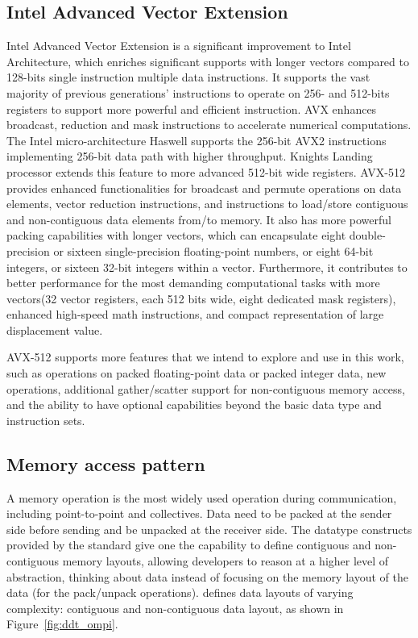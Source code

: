 \documentclass[conference]{IEEEtran}
\begin{document}
\subsection{Intel Advanced Vector Extension}
Intel Advanced Vector Extension is a significant improvement to Intel Architecture, which enriches
significant supports with longer vectors compared to 128-bits single instruction multiple data instructions.
It supports the vast majority of previous generations' instructions to operate on 256- and 512-bits registers to support
more powerful and efficient instruction.
%
AVX enhances broadcast, reduction and mask instructions to accelerate
numerical computations. The Intel micro-architecture Haswell supports the 256-bit AVX2 instructions
implementing 256-bit data path with higher throughput. Knights Landing processor
extends this feature to more advanced 512-bit wide registers. AVX-512 provides enhanced functionalities
for broadcast and permute operations on data elements, vector reduction instructions,
and instructions to load/store contiguous and non-contiguous data elements from/to memory.
It also has more powerful packing capabilities with longer vectors, which can encapsulate eight double-precision
or sixteen single-precision floating-point numbers, or eight 64-bit integers, or sixteen 32-bit integers within a vector.
Furthermore, it contributes to better performance for the most
demanding computational tasks with more vectors(32 vector registers, each 512 bits wide,
eight dedicated mask registers), enhanced high-speed math instructions,
and compact representation of large displacement value.

AVX-512 supports more features that we intend to explore and use in this work, such as operations on packed
floating-point data or packed integer data, new operations, additional
gather/scatter support for non-contiguous memory access, and the ability to have
optional capabilities beyond the basic data type and instruction sets.

\subsection{Memory access pattern}

A memory operation is the most widely used operation during communication, including point-to-point and collectives.
Data need to be packed at the sender side before sending and be unpacked at the receiver side.
The datatype constructs provided by the \mpi standard give one the capability
to define contiguous and non-contiguous memory layouts, allowing developers
to reason at a higher level of abstraction, thinking about data instead of focusing
on the memory layout of the data (for the pack/unpack operations). \mpi defines data
layouts of varying complexity: contiguous and non-contiguous data layout, as shown in Figure~\ref{fig:ddt_ompi}.
\end{document}
